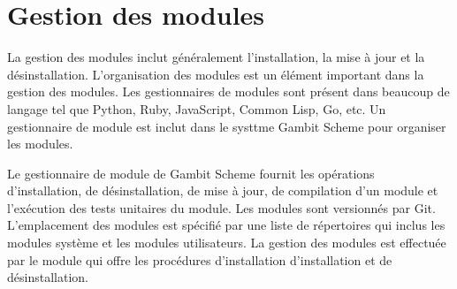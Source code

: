 
\chapter{Gestion des modules}
\label{ch:module_management}
La gestion des modules inclut généralement l'installation, la mise à jour et
la désinstallation. L'organisation des modules est un élément important
dans la gestion des modules. Les gestionnaires de modules sont présent dans
beaucoup de langage tel que Python, Ruby, JavaScript, Common Lisp, Go, etc.
Un gestionnaire de module est inclut dans le systtme Gambit Scheme pour
organiser les modules.

Le gestionnaire de module de Gambit Scheme fournit les opérations
d'installation, de désinstallation, de mise à jour, de compilation
d'un module et l'exécution des tests unitaires du module. Les modules
sont versionnés par Git. L'emplacement des modules est spécifié par
une liste de répertoires qui inclus les modules système et les modules
utilisateurs. La gestion des modules est effectuée par le module 
qui offre les procédures d'installation d'installation et de désinstallation.





